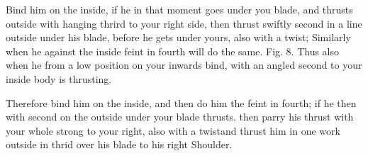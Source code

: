 \exercise{}
Bind him on the inside, if he in that moment goes under you blade, and
thrusts outside with hanging thrird to your right side, then thrust
swiftly second in a line outside under his blade, before he gets under
yours, also with a twist; Similarly when he against the inside feint
in fourth will do the same. Fig. 8. Thus also when he from a low
position on your inwards bind, with an angled second to your inside
body is thrusting.


\exercise{}
Therefore bind him on the inside, and then do him the feint in fourth;
if he then with second on the outside under your blade thrusts. then
parry his thrust with your whole strong to your right, also with a
twistand thrust him in one work outside in thrid over his blade to his
right Shoulder.
